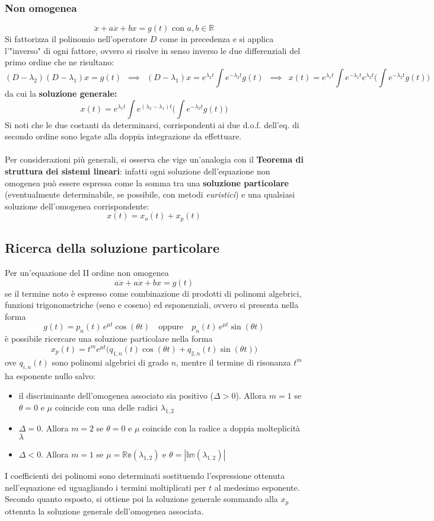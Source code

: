 \documentclass[10pt, oneside]{book}
\theoremstyle{plain}
\begin{document}
\subsubsection*{Non omogenea}
\[\ddot x + a \dot x + b x = g(t) \textrm{ con } a, b \in \mathbb{R}\]
Si fattorizza il polinomio nell'operatore $D$ come in precedenza e si applica l'"inverso" di ogni fattore, ovvero si risolve in senso inverso le due differenziali del primo ordine che ne risultano:
\[(D - \lambda_2) (D - \lambda_1) x = g(t) \enspace \implies \enspace (D - \lambda_1) x = e^{\lambda_2 t} \int e^{- \lambda_2 t} g(t) \enspace \implies \enspace x(t) = e^{\lambda_1 t}\int e^{- \lambda_1 t} e^{\lambda_2 t} \bigg(\int e^{- \lambda_2 t}g(t)\bigg)\]
da cui la \textbf{soluzione generale:}
\[\boxed{x(t) = e^{\lambda_1 t}\int e^{(\lambda_2 - \lambda_1) t} \bigg(\int e^{- \lambda_2 t}g(t)\bigg)}\]
Si noti che le due costanti da determinarsi, corrispondenti ai due d.o.f. dell'eq. di secondo ordine sono legate alla doppia integrazione da effettuare.
\\~\\Per considerazioni più generali, si osserva che vige un'analogia con il \textbf{Teorema di struttura dei sistemi lineari}: infatti ogni soluzione dell'equazione non omogenea può essere espressa come la somma tra una \textbf{soluzione particolare} (eventualmente determinabile, se possibile, con metodi \textit{euristici}) e una qualsiasi soluzione dell'omogenea corrispondente:
\[x(t) = x_o(t) + x_p(t)\]

\subsection{Ricerca della soluzione particolare}
Per un'equazione del II ordine non omogenea
\[a \ddot x + a \dot x + b x = g(t)\]
se il termine noto è espresso come combinazione di prodotti di polinomi algebrici, funzioni trigonometriche (seno e coseno) ed esponenziali, ovvero si presenta nella forma
\[g(t) = p_n(t) \, e^{\mu t} \cos (\theta t) \quad \textrm{oppure} \quad p_n(t) \, e^{\mu t} \sin (\theta t)\]
è possibile ricercare una soluzione particolare nella forma
\[x_p(t) = t^m e^{\mu t} \big(q_{1,n}(t) \cos (\theta t) + q_{2,n}(t) \sin (\theta t)\big)\]
ove $q_{i,n}(t)$ sono polinomi algebrici di grado $n$, mentre il termine di risonanza $t^m$ ha esponente nullo salvo:
\begin{itemize}
\item il discriminante dell'omogenea associato sia positivo ($\Delta > 0$). Allora $m =1$ se $\theta = 0$ e $\mu$ coincide con una delle radici $\lambda_{1,2}$
\item $\Delta = 0$. Allora $m=2$ se $\theta = 0$ e $\mu$ coincide con la radice a doppia molteplicità $\lambda$
\item $\Delta < 0$. Allora $m = 1$ se $\mu = \mathbb{Re}(\lambda_{1,2})$ e $\theta = |\mathbb{Im}(\lambda_{1,2})|$
\end{itemize}
I coefficienti dei polinomi sono determinati sostituendo l'espressione ottenuta nell'equazione ed uguagliando i termini moltiplicati per $t$ al medesimo esponente.
\\Secondo quanto esposto, si ottiene poi la soluzione generale sommando alla $x_p$ ottenuta la soluzione generale dell'omogenea associata.
\end{document}
